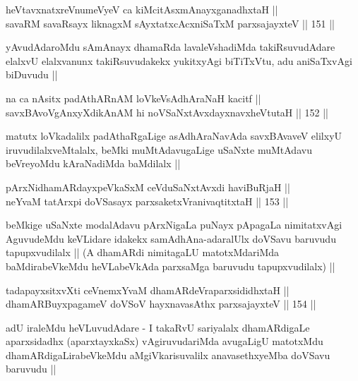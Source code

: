\begin{shl}
heVtavxnatxreV\s numeVyeV ca kiMcitAsxmAnayxganadhxtaH || \\
savaRM savaRsayx liknagxM sAyxtatxcAcxniSaTxM parxsajayxteV ||  151 ||  
\end{shl}

\begin{artha}
yAvudAdaroMdu sAmAnayx dhamaRda lavaleVshadiMda takiRsuvudAdare elalxvU elalxvanunx takiRsuvudakekx yukitxyAgi biTiTxVtu, adu aniSaTxvAgi biDuvudu ||
\end{artha}

\begin{shl}
na ca nAsitx padAthARnAM loVkeV\s sAdhAraNaH kacitf || \\
savxBAvoV\s gAnxyXdikAnAM hi noVSaNxtAvxdayxnavxheVtutaH ||  152 ||  
\end{shl}

\begin{artha}
matutx loVkadalilx padAthaRgaLige asAdhAraNavAda savxBAvaveV elilxyU iruvudilalxveMtalalx, beMki muMtAdavugaLige uSaNxte muMtAdavu beVreyoMdu kAraNadiMda baMdilalx ||
\end{artha}

\begin{shl}
pArxNidhamARdayxpeVkaSxM ceVduSaNxtAvxdi haviBuRjaH || \\
neYvaM tatArxpi doVSasayx parxsaketxVranivaqtitxtaH ||  153 ||  
\end{shl}

\begin{artha}
beMkige uSaNxte modalAdavu pArxNigaLa puNayx pApagaLa nimitatxvAgi AguvudeMdu keVLidare idakekx samAdhAna-adaralUlx doVSavu baruvudu tapupxvudilalx || (A dhamARdi nimitagaLU matotxMdariMda baMdirabeVkeMdu heVLabeVkAda parxsaMga baruvudu tapupxvudilalx) ||
\end{artha}

\begin{shl}
tadapayxsitxvXti ceVnemxYvaM dhamARdeVraparxsididhxtaH || \\
dhamARBuyxpagameV doVSoV hayxnavasAthx parxsajayxteV ||  154 ||  
\end{shl}

\begin{artha}
adU iraleMdu heVLuvudAdare - I takaRvU sariyalalx dhamARdigaLe aparxsidadhx (aparxtayxkaSx) vAgiruvudariMda avugaLigU matotxMdu dhamARdigaLirabeVkeMdu aMgiVkarisuvalilx anavasethxyeMba doVSavu baruvudu ||
\end{artha}

